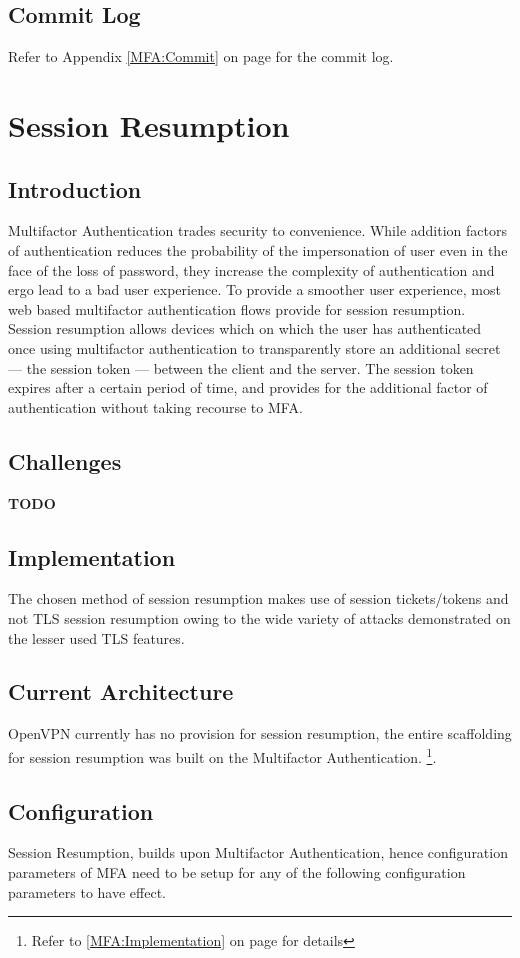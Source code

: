 \documentclass[11pt,oneside]{book}
\newcommand{\mychapter}[2]{
    \setcounter{chapter}{#1}
    \setcounter{section}{0}
    \chapter*{#2}
    \addcontentsline{toc}{chapter}{#2}
}
\begin{document}
\section{Commit Log}
Refer to Appendix \ref{MFA:Commit} on page \pageref{MFA:Commit} for the commit log.

\mychapter{3}{Session Resumption}
\section{Introduction}
Multifactor Authentication trades security to convenience. While addition factors of authentication
reduces the probability of the impersonation of user even in the face of the loss of password,
they increase the complexity of authentication and ergo lead to a bad user experience.
To provide a smoother user experience, most web based multifactor authentication
flows provide for session resumption. Session resumption allows devices which on which the user has authenticated
once using multifactor authentication to transparently store an additional secret --- the session
token --- between the client and the server. The session token expires after a certain period of
time, and provides for the additional factor of authentication without taking recourse to MFA.

\section{Challenges}
\textbf{TODO}

\section{Implementation}
The chosen method of session resumption makes use of session tickets/tokens and not TLS session
resumption owing to the wide variety of attacks\cite{TLS_Insecure} demonstrated on the lesser used TLS features.

\section{Current Architecture}
OpenVPN currently has no provision for session resumption, the entire scaffolding for session
resumption was built on the Multifactor Authentication. \footnote{ Refer to \ref{MFA:Implementation}
on page \pageref{MFA:Implementation} for details}.

\section{Configuration}
Session Resumption, builds upon Multifactor Authentication, hence configuration parameters of MFA
need to be setup for any of the following configuration parameters to have effect.
\end{document}
